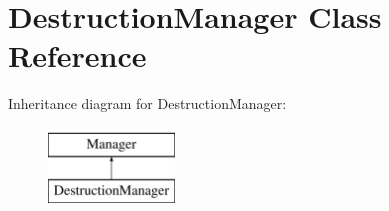 \hypertarget{class_destruction_manager}{\section{Destruction\+Manager Class Reference}
\label{class_destruction_manager}
}
Inheritance diagram for Destruction\+Manager\+:\begin{figure}[H]
\begin{center}
\leavevmode
\includegraphics[height=2.000000cm]{class_destruction_manager}
\end{center}
\end{figure}

